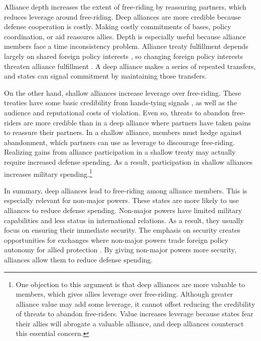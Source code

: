 \documentclass[12pt]{article}
\begin{document}
Alliance depth increases the extent of free-riding by reassuring partners, which reduces leverage around free-riding.  
Deep alliances are more credible because defense cooperation is costly. 
Making costly commitments of bases, policy coordination, or aid reassures allies. 
Depth is especially useful because alliance members face a time inconsistency problem. 
Alliance treaty fulfillment depends largely on shared foreign policy interests \citep{Morrow2000, Leeds2003a}, so changing foreign policy interests threaten alliance fulfillment \citep{LeedsSavun2007}. 
A deep alliance makes a series of repeated transfers, and states can signal commitment by maintaining those transfers.  


On the other hand, shallow alliances increase leverage over free-riding. 
These treaties have some basic credibility from hands-tying signals \citep{Fearon1997}, as well as the audience \cite{Morrow2000} and reputational \citep{Gibler2008, Crescenzietal2012} costs of violation.
Even so, threats to abandon free-riders are more credible than in a deep alliance where partners have taken pains to reassure their partners.  
In a shallow alliance, members must hedge against abandonment, which partners can use as leverage to discourage free-riding. 
Realizing gains from alliance participation in a shallow treaty may actually require increased defense spending.
As a result, participation in shallow alliances increases military spending.\footnote{
One objection to this argument is that deep alliances are more valuable to members, which gives allies leverage over free-riding. 
Although greater alliance value may add some leverage, it cannot offset reducing the credibility of threats to abandon free-riders.
Value increases leverage because states fear their allies will abrogate a valuable alliance, and deep alliances counteract this essential concern. 
}


In summary, deep alliances lead to free-riding among alliance members. 
This is especially relevant for non-major powers.
These states are more likely to use alliances to reduce defense spending. 
Non-major powers have limited military capabilities and less status in international relations. 
As a result, they usually focus on ensuring their immediate security.  
The emphasis on security creates opportunities for exchanges where non-major powers trade foreign policy autonomy for allied protection \citep{Altfield1984, Morrow1991}. 
By giving non-major powers more security, alliances allow them to reduce defense spending. 
\end{document}
